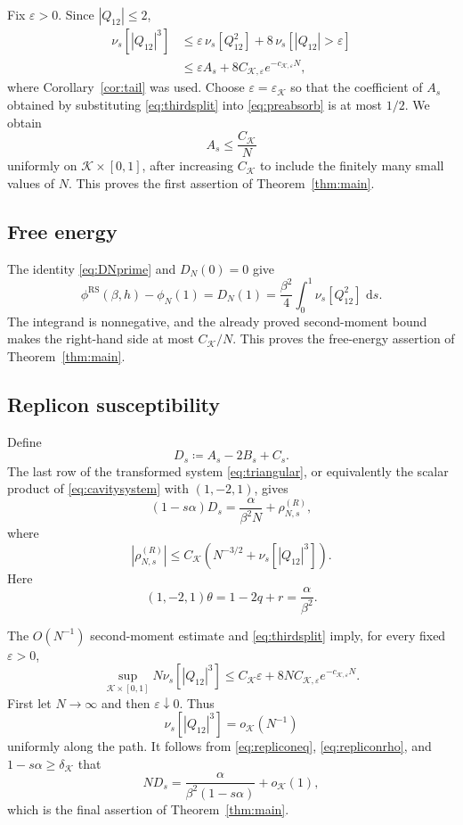 \documentclass[11pt]{article}
\numberwithin{equation}{section}
\newcommand{\1}{\mathbf 1}
\newcommand{\cK}{\mathcal K}
\newcommand{\dd}{\,\mathrm d}
\begin{document}
Fix $\varepsilon>0$.  Since $|Q_{12}|\le2$,
\begin{align}
 \nu_s[|Q_{12}|^3]
 &\le
 \varepsilon\,\nu_s[Q_{12}^2]
 +8\,\nu_s[|Q_{12}|>\varepsilon]\nonumber\\
 &\le
 \varepsilon A_s
 +8C_{\cK,\varepsilon}e^{-c_{\cK,\varepsilon}N},
 \label{eq:thirdsplit}
\end{align}
where Corollary~\ref{cor:tail} was used.  Choose
$\varepsilon=\varepsilon_{\cK}$
so that the coefficient of $A_s$ obtained by substituting
\eqref{eq:thirdsplit} into \eqref{eq:preabsorb} is at most $1/2$.
We obtain
\[
 A_s\le\frac{C_{\cK}}N
\]
uniformly on $\cK\times[0,1]$, after increasing $C_{\cK}$ to include
the finitely many small values of $N$.  This proves the first assertion
of Theorem~\ref{thm:main}.

\subsection{Free energy}\label{subsec:freeenergy}

The identity \eqref{eq:DNprime} and $D_N(0)=0$ give
\begin{equation}
 \phi^{\mathrm{RS}}(\beta,h)-\phi_N(1)
 =D_N(1)=
 \frac{\beta^2}{4}\int_0^1\nu_s[Q_{12}^2]\,\dd s.
 \label{eq:freeenergyidentity}
\end{equation}
The integrand is nonnegative, and the already proved second-moment
bound makes the right-hand side at most $C_{\cK}/N$.  This proves the
free-energy assertion of Theorem~\ref{thm:main}.

\subsection{Replicon susceptibility}\label{subsec:susceptibility}

Define
\[
 D_s\coloneqq A_s-2B_s+C_s.
\]
The last row of the transformed system \eqref{eq:triangular}, or
equivalently the scalar product of \eqref{eq:cavitysystem} with
$(1,-2,1)$, gives
\begin{equation}
 (1-s\alpha)D_s=\frac{\alpha}{\beta^2N}+\rho^{(R)}_{N,s},
 \label{eq:repliconeq}
\end{equation}
where
\begin{equation}
 |\rho^{(R)}_{N,s}|
 \le C_{\cK}\left(N^{-3/2}+\nu_s[|Q_{12}|^3]\right).
 \label{eq:repliconrho}
\end{equation}
Here
\[
 (1,-2,1)\theta=1-2q+r=\frac{\alpha}{\beta^2}.
\]

The $O(N^{-1})$ second-moment estimate and
\eqref{eq:thirdsplit} imply, for every fixed $\varepsilon>0$,
\[
 \sup_{\cK\times[0,1]}
 N\nu_s[|Q_{12}|^3]
 \le C_{\cK}\varepsilon
 +8N C_{\cK,\varepsilon}e^{-c_{\cK,\varepsilon}N}.
\]
First let $N\to\infty$ and then $\varepsilon\downarrow0$.  Thus
\[
 \nu_s[|Q_{12}|^3]=o_{\cK}(N^{-1})
\]
uniformly along the path.  It follows from
\eqref{eq:repliconeq}, \eqref{eq:repliconrho}, and
$1-s\alpha\ge\delta_{\cK}$ that
\[
 ND_s
 =
 \frac{\alpha}{\beta^2(1-s\alpha)}+o_{\cK}(1),
\]
which is the final assertion of Theorem~\ref{thm:main}.
\end{document}
